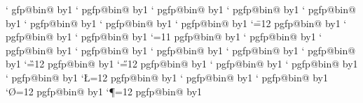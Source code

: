 {{\catcode`	\expandafter\xdef\csname pgfp@bin@\the{} \advance{} by1
\catcode`	\expandafter\xdef\csname pgfp@bin@\the{} \advance{} by1
\catcode`	\expandafter\xdef\csname pgfp@bin@\the{} \advance{} by1
\catcode`	\expandafter\xdef\csname pgfp@bin@\the{} \advance{} by1
\catcode`	\expandafter\xdef\csname pgfp@bin@\the{} \advance{} by1
\catcode`	\expandafter\xdef\csname pgfp@bin@\the{} \endcsname{:}\advance{} by1
\catcode`	\expandafter\xdef\csname pgfp@bin@\the{} \endcsname{;}\advance{} by1
\catcode`	\expandafter\xdef\csname pgfp@bin@\the{} \endcsname{<}\advance{} by1
\catcode`\==12	\expandafter\xdef\csname pgfp@bin@\the{} \endcsname{=}\advance{} by1
\catcode`	\expandafter\xdef\csname pgfp@bin@\the{} \endcsname{>}\advance{} by1
\catcode`	\expandafter\xdef\csname pgfp@bin@\the{} \advance{} by1
\catcode`\@=11	\expandafter\xdef\csname pgfp@bin@\the{} \advance{} by1
\catcode`	\expandafter\xdef\csname pgfp@bin@\the{} \advance{} by1
\catcode`	\expandafter\xdef\csname pgfp@bin@\the{} \advance{} by1
\catcode`	\expandafter\xdef\csname pgfp@bin@\the{} \advance{} by1
\catcode`	\expandafter\xdef\csname pgfp@bin@\the{} \advance{} by1
\catcode`	\expandafter\xdef\csname pgfp@bin@\the{} \advance{} by1
\catcode`	\expandafter\xdef\csname pgfp@bin@\the{} \advance{} by1
\catcode`\G=12	\expandafter\xdef\csname pgfp@bin@\the{} \advance{} by1
\catcode`\H=12	\expandafter\xdef\csname pgfp@bin@\the{} \advance{} by1
\catcode`	\expandafter\xdef\csname pgfp@bin@\the{} \advance{} by1
\catcode`	\expandafter\xdef\csname pgfp@bin@\the{} \advance{} by1
\catcode`	\expandafter\xdef\csname pgfp@bin@\the{} \advance{} by1
\catcode`\L=12	\expandafter\xdef\csname pgfp@bin@\the{} \advance{} by1
\catcode`	\expandafter\xdef\csname pgfp@bin@\the{} \advance{} by1
\catcode`	\expandafter\xdef\csname pgfp@bin@\the{} \advance{} by1
\catcode`\O=12	\expandafter\xdef\csname pgfp@bin@\the{} \advance{} by1
\catcode`\P=12	\expandafter\xdef\csname pgfp@bin@\the{} \advance{} by1
}}
